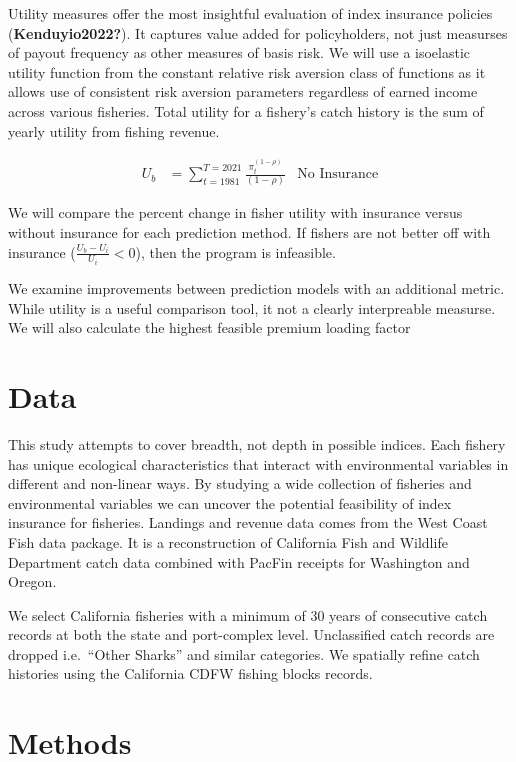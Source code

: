 \documentclass[
  letterpaper,
  DIV=11,
  numbers=noendperiod]{scrartcl}
\begin{document}
Utility measures offer the most insightful evaluation of index insurance
policies (\textbf{Kenduyio2022?}). It captures value added for
policyholders, not just measurses of payout frequency as other measures
of basis risk. We will use a isoelastic utility function from the
constant relative risk aversion class of functions as it allows use of
consistent risk aversion parameters regardless of earned income across
various fisheries. Total utility for a fishery's catch history is the
sum of yearly utility from fishing revenue.

\[
\begin{aligned}
U_{b}&=\sum_{t=1981}^{T=2021}\frac{\pi_t^{(1-\rho)}}{(1-\rho)} &\text{No Insurance}
\end{aligned}
\]

We will compare the percent change in fisher utility with insurance
versus without insurance for each prediction method. If fishers are not
better off with insurance (\(\frac{U_{b}-U_{i}}{U_{i}}<0\)), then the
program is infeasible.

We examine improvements between prediction models with an additional
metric. While utility is a useful comparison tool, it not a clearly
interpreable measurse. We will also calculate the highest feasible
premium loading factor

\hypertarget{data}{%
\section{Data}\label{data}}

This study attempts to cover breadth, not depth in possible indices.
Each fishery has unique ecological characteristics that interact with
environmental variables in different and non-linear ways. By studying a
wide collection of fisheries and environmental variables we can uncover
the potential feasibility of index insurance for fisheries. Landings and
revenue data comes from the West Coast Fish data package. It is a
reconstruction of California Fish and Wildlife Department catch data
combined with PacFin receipts for Washington and Oregon.

We select California fisheries with a minimum of 30 years of consecutive
catch records at both the state and port-complex level. Unclassified
catch records are dropped i.e.~``Other Sharks'' and similar categories.
We spatially refine catch histories using the California CDFW fishing
blocks records.

\hypertarget{methods}{%
\section*{Methods}\label{methods}}
\end{document}
